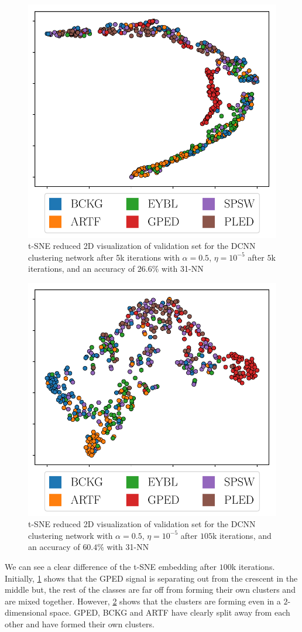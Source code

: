 \begin{figure}[!ht]
	\centering
	\includegraphics[width=0.65\linewidth]{pictures/tsne_plot_start.pdf}
	\caption[t-SNE visualization after $5$k iterations]{t-SNE reduced 2D visualization  of validation set for the DCNN clustering network after 5k iterations with $\alpha = 0.5$, $\eta = 10^{-5}$ after $5$k iterations, and an accuracy of $26.6\%$ with 31-NN}\label{fig:tsne_start}  
\end{figure}


\begin{figure}[!ht]
	\centering
	\includegraphics[width=0.65\linewidth]{pictures/tsne_plot.pdf}
	\caption[t-SNE visualization after $105$k iterations]{t-SNE reduced 2D visualization  of validation set for the DCNN clustering network with $\alpha = 0.5$, $\eta = 10^{-5}$ after $105$k iterations, and an accuracy of $60.4\%$ with 31-NN}\label{fig:tsne}  
\end{figure}

We can see a clear difference of the t-SNE embedding after $100$k iterations. Initially, \cref{fig:tsne_start} shows that the GPED signal is separating out from the crescent in the middle but, the rest of the classes are far off from forming their own clusters and are mixed together. However, \cref{fig:tsne} shows that the clusters are forming even in a $2$-dimensional space.  GPED, BCKG and ARTF have clearly split away from each other and have formed their own clusters. 

